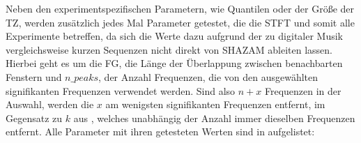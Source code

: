         Neben den experimentspezifischen Parametern, wie Quantilen oder der Größe der \acl{TZ}, werden zusätzlich jedes Mal Parameter getestet, die die \ac{STFT} und somit alle Experimente betreffen, da sich die Werte dazu aufgrund der zu digitaler Musik vergleichsweise kurzen Sequenzen nicht direkt von SHAZAM ableiten lassen. Hierbei geht es um die \ac{FG}, die Länge der Überlappung zwischen benachbarten Fenstern und $n\_peaks$, der Anzahl Frequenzen, die von den ausgewählten signifikanten Frequenzen verwendet werden. Sind also $n+x$ Frequenzen in der Auswahl, werden die $x$ am wenigsten signifikanten Frequenzen entfernt, im Gegensatz zu $k$ aus , welches unabhängig der Anzahl immer dieselben Frequenzen entfernt. Alle Parameter mit ihren getesteten Werten sind in  aufgelistet:
        

